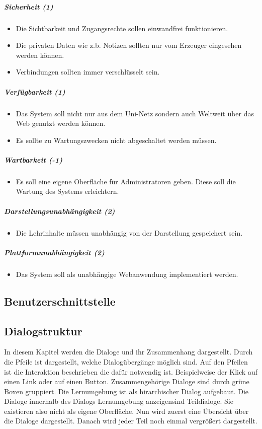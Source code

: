 \documentclass[12pt,a4paper]{article}
\begin{document}
{\subparagraph{Sicherheit (1)}
\begin{itemize}
\item Die Sichtbarkeit und Zugangsrechte sollen einwandfrei funktionieren.
\item Die privaten Daten wie z.b. Notizen sollten nur vom Erzeuger eingesehen werden können.
\item Verbindungen sollten immer verschlüsselt sein.
\end{itemize}
\subparagraph{Verfügbarkeit (1)}
\begin{itemize}
\item Das System soll nicht nur aus dem Uni-Netz sondern auch Weltweit über das Web genutzt werden können.
\item Es sollte zu Wartungszwecken nicht abgeschaltet werden müssen.
\end{itemize}
\subparagraph{Wartbarkeit (-1)}
\begin{itemize}
\item Es soll eine eigene Oberfläche für Administratoren geben. Diese soll  die Wartung des Systems erleichtern.
\end{itemize}
\subparagraph{Darstellungsunabhängigkeit (2)}
\begin{itemize}
\item Die Lehrinhalte müssen unabhängig von der Darstellung gespeichert sein.
\end{itemize}
\subparagraph{Plattformunabhängigkeit (2)}
\begin{itemize}
\item Das System soll als unabhängige Webanwendung implementiert werden.
\end{itemize}


\begin{landscape}
\section{Benutzerschnittstelle}
	
\subsection{Dialogstruktur}
In diesem Kapitel werden die Dialoge und ihr Zusammenhang dargestellt. Durch die Pfeile ist dargestellt, welche Dialogübergänge möglich sind. Auf den Pfeilen ist die Interaktion beschrieben die dafür notwendig ist. Beispielweise der Klick auf einen Link oder auf einen Button. Zusammengehörige Dialoge sind durch grüne Boxen gruppiert. Die Lernumgebung ist als hirarchischer Dialog aufgebaut. Die Dialoge innerhalb des Dialogs \glqq Lernumgebung anzeigen\grqq sind Teildialoge. Sie existieren also nicht als eigene Oberfläche. Nun wird zuerst eine Übersicht über die Dialoge dargestellt. Danach wird jeder Teil noch einmal vergrößert dargestellt.


\end{landscape}}
\end{document}
